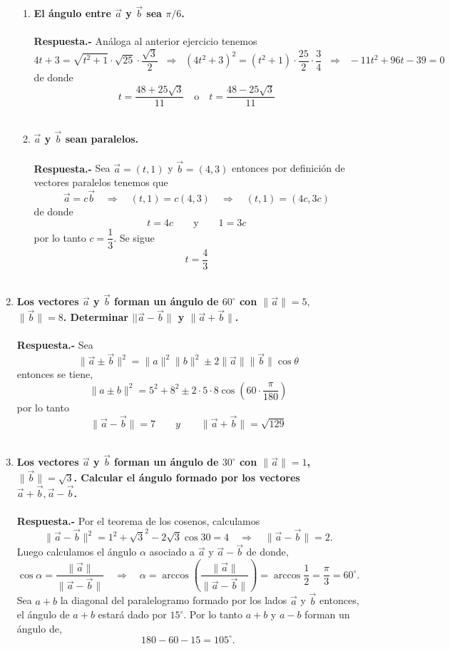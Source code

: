 \begin{enumerate}
\begin{enumerate}[\bfseries a)]
    \item \textbf{\boldmath El ángulo entre $\vec{a}$ y $\vec{b}$ sea $\pi/6$.\\\\
	Respuesta.-}\; Análoga al anterior ejercicio tenemos $$4t+3=\sqrt{t^2+1}\cdot \sqrt{25}\cdot \dfrac{\sqrt{3}}{2}\;\; \Rightarrow \; \; (4t^2+3)^2=(t^2+1)\cdot\dfrac{25}{2}\cdot \dfrac{3}{4}\;\; \Rightarrow \; \; -11t^2+96t-39=0$$
	de donde $$t=\dfrac{48+25\sqrt{3}}{11} \quad \mbox{o} \quad t=\dfrac{48-25\sqrt{3}}{11}$$\\

    \item \textbf{\boldmath $\vec{a}$ y $\vec{b}$ sean paralelos.\\\\
	Respuesta.-}\; Sea $\vec{a}=(t,1)$ y $\vec{b}=(4,3)$ entonces por definición de vectores paralelos tenemos que $$\vec{a}=c\vec{b} \quad \Rightarrow \quad (t,1)=c(4,3) \quad \Rightarrow \quad (t,1)=(4c,3c)$$
	de donde $$t=4c \qquad \mbox{y} \qquad 1=3c$$
	por lo tanto $c=\dfrac{1}{3}$. Se sigue $$t=\dfrac{4}{3}$$\\

\end{enumerate}

\item \textbf{\boldmath Los vectores $\vec{a}$ y $\vec{b}$ forman un ángulo de $60^\circ$ con $\|\vec{a}\|=5,$ $\|\vec{b}\|=8$. Determinar $||\vec{a}-\vec{b}\|$ y $\|\vec{a}+\vec{b}\|$.\\\\
    Respuesta.-}\; Sea $$\| \vec{a}\pm\vec{b}\|^2=\|a\|^2\|b\|^2 \pm 2\|\vec{a}\|\|\vec{b}\|\cos \theta$$  
    entonces se tiene, $$\|a\pm b\|^2 = 5^2 + 8^2 \pm 2\cdot 5\cdot 8 \cos\left(60\cdot\dfrac{\pi}{180}\right)$$
    por lo tanto $$\|\vec{a}-\vec{b}\| = 7 \qquad y \qquad \|\vec{a}+\vec{b}\| = \sqrt{129}$$\\

\item \textbf{\boldmath Los vectores $\vec{a}$ y $\vec{b}$ forman un ángulo de $30^\circ$ con $\|\vec{a}\|=1$, $\|\vec{b}\|=\sqrt{3}$. Calcular el ángulo formado por los vectores $\vec{a}+\vec{b}, \vec{a}-\vec{b}$.\\\\
    Respuesta.-}\; Por el teorema de los cosenos, calculamos $$\|\vec{a}-\vec{b}\|^2 = 1^2 + \sqrt{3}^2 - 2\sqrt{3} \cos 30 = 4 \quad \Rightarrow \quad \|\vec{a}-\vec{b}\|=2.$$
    Luego calculamos el ángulo $\alpha$ asociado a $\vec{a}$ y $\vec{a}-\vec{b}$ de donde, 
    $$\cos\alpha = \dfrac{\|\vec{a}\|}{\|\vec{a}-\vec{b}\|} \quad \Rightarrow \quad \alpha =\arccos \left(\dfrac{\|\vec{a}\|}{\|\vec{a}-\vec{b}\|}\right) = \arccos\dfrac{1}{2}=\dfrac{\pi}{3}=60^\circ.$$
    Sea  $a+b$ la diagonal del paralelogramo formado por los lados $\vec{a}$ y $\vec{b}$ entonces, el ángulo de $a+b$ estará dado por $15^\circ$. Por lo tanto  $a+b$ y  $a-b$ forman un ángulo de, 
    $$180-60-15=105^\circ.$$\\


\end{enumerate}
